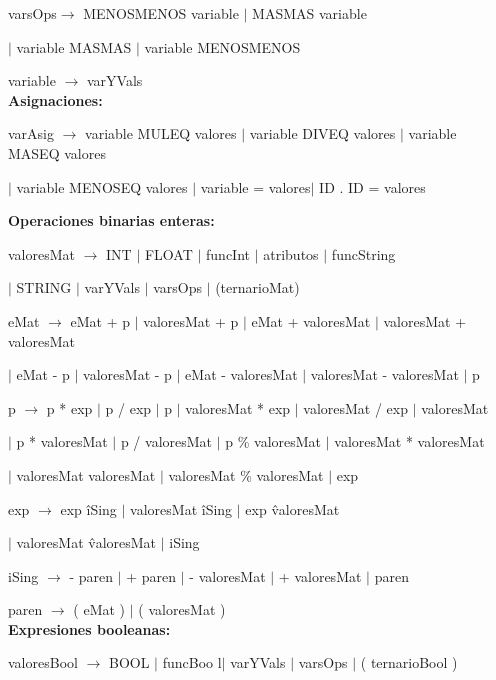 varsOps$\rightarrow$ MENOSMENOS variable $|$ MASMAS variable

\hspace{15mm}$|$ variable MASMAS $|$ variable MENOSMENOS

variable $\rightarrow$ varYVals  \\

\textbf{Asignaciones:} 

  varAsig $\rightarrow$ variable MULEQ valores $|$ variable DIVEQ valores $|$ variable MASEQ valores
  
  \hspace{15mm}$|$ variable MENOSEQ valores $|$ variable = valores$|$ ID . ID = valores 



\textbf{Operaciones binarias enteras:} 

 valoresMat $\rightarrow$ INT $|$ FLOAT $|$ funcInt $|$ atributos $|$ funcString
 
  \hspace{15mm} $|$ STRING $|$ varYVals $|$ varsOps $|$ (ternarioMat)  
  
 
eMat $\rightarrow$ eMat + p $|$ valoresMat + p $|$ eMat + valoresMat $|$ valoresMat + valoresMat
  
  \hspace{15mm} $|$ eMat - p  $|$ valoresMat - p  $|$ eMat - valoresMat $|$ valoresMat - valoresMat $|$ p
  
 p $\rightarrow$ p * exp $|$ p / exp $|$ p  $|$ valoresMat * exp $|$ valoresMat / exp $|$ valoresMat 
 
   \hspace{15mm} $|$ p * valoresMat $|$ p / valoresMat $|$ p \% valoresMat $|$ valoresMat * valoresMat
   
   \hspace{15mm} $|$ valoresMat \/ valoresMat $|$ valoresMat \% valoresMat $|$ exp
    
 exp $\rightarrow$ exp \^ iSing $|$ valoresMat \^ iSing $|$ exp \^ valoresMat
 
 \hspace{15mm} $|$ valoresMat \^ valoresMat $|$ iSing
  
iSing $\rightarrow$ - paren $|$ + paren $|$ - valoresMat $|$ + valoresMat $|$ paren
  
  
 paren $\rightarrow$ ( eMat )  $|$ ( valoresMat ) \\
  
  
\textbf{Expresiones booleanas:} 

valoresBool $\rightarrow$ BOOL $|$ funcBoo l$|$ varYVals $|$ varsOps $|$ (  ternarioBool )  
 
